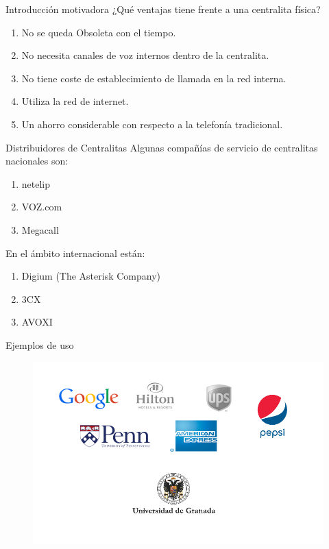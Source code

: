\documentclass[11pt]{beamer}
\begin{document}
\begin{frame}{Introducción motivadora}
¿Qué ventajas tiene frente a una centralita física?\\

\begin{enumerate}[$\bullet$]
\item No se queda Obsoleta con el tiempo.
\item No necesita canales de voz internos dentro de la centralita.
\item No tiene coste de establecimiento de llamada en la red interna.
\item Utiliza la red de internet.
\item Un ahorro considerable con respecto a la telefonía tradicional.
\end{enumerate}
\end{frame}

\begin{frame}{Distribuidores de Centralitas}
Algunas compañías de servicio de centralitas nacionales son:
\begin{enumerate}
\item netelip
\item VOZ.com
\item Megacall
\end{enumerate}
\vspace*{1cm}
En el ámbito internacional están:
\begin{enumerate}
\item Digium (The Asterisk Company)
\item 3CX
\item AVOXI
\end{enumerate}

\end{frame}


\begin{frame}{Ejemplos de uso}
\begin{figure}[H] %
\centering
\includegraphics[scale=0.4]{./imagenes/logos.png}
\end{figure}

\end{frame}
\end{document}
